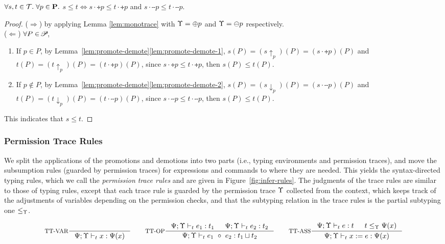 {{{\begin{lemma}\label{lem:tracesub}
$\forall s,t\in\mathcal{T}.\; \forall p\in\mathbf{P}.$ $s\leq t\Leftrightarrow  s\cdot\tplus{ p}\leq t\cdot\tplus{ p}$ and $s\cdot\tminus{ p}\leq t\cdot\tminus{ p}$.
\end{lemma}
\begin{proof}
($\Rightarrow$) by applying Lemma \ref{lem:monotrace} with $\Upsilon=\oplus  p$ and $\Upsilon=\ominus p$ respectively.\\
($\Leftarrow$) $\forall P\in\!\mathscr{P}\!$,
\begin{enumerate}[label=(\arabic*)]
	\item If $p\in P$, by Lemma~\ref{lem:promote-demote}\ref{lem:promote-demote-1}, $s(P)=(s\uparrow_{p})(P)=(s\cdot\tplus{ p})(P)$ and $t(P)=(t\uparrow_{p})(P)=(t\cdot\tplus{ p})(P)$, since $s\cdot\tplus{ p}\leq t\cdot\tplus{ p}$, then $s(P)\leq t(P)$.
	\item If $p\not\in P$, by Lemma~\ref{lem:promote-demote}\ref{lem:promote-demote-2}, $s(P)=(s\downarrow_{p})(P)=(s\cdot\tminus{ p})(P)$ and $t(P)=(t\downarrow_{p})(P)=(t\cdot\tminus{ p})(P)$, since $s\cdot\tminus{ p}\leq t\cdot\tminus{p}$, then $s(P)\leq t(P)$.
\end{enumerate}
This indicates that $s\leq t$.
\end{proof}


\subsubsection{\textbf{Permission Trace Rules}}
 We split the applications of the promotions and demotions into two parts  (i.e., typing environments and permission traces), and move the subsumption rules (guarded by permission traces) for expressions and commands to where they are needed.
This yields the syntax-directed  typing rules, which we call the {\em permission trace rules} and are given in Figure~\ref{fig:infer-rules}.
The judgments of the trace rules are similar to those of typing rules, except that each trace rule is guarded by the permission trace $\Upsilon$ collected from the context, which keeps track of the adjustments of variables depending on the permission checks,
and that the subtyping relation in the trace rules is the partial subtyping one $\leq_{\Upsilon}$.

\begin{figure*}[ht]
\begin{scriptsize}
\[
\inference[TT-VAR]{}
{\Psi;\trace\vdash_{t} \leVAR{x} : \Psi(x)}
\qquad
\inference[TT-OP]
{\Psi;\trace\vdash_{t} e_1: t_1 & \Psi;\trace \vdash_{t} e_2: t_2}
{\Psi;\trace \vdash_{t} \leOP{e_1}{e_2} : t_1\sqcup t_2}
\qquad
\inference[TT-ASS]
{\Psi;\trace \vdash_{t} e : t & t \leq_{\trace} \Psi(x)}
{\Psi;\trace \vdash_{t} \lcASS{x}{e} : \Psi(x)}
\]



\end{scriptsize}
\end{figure*}}}}
